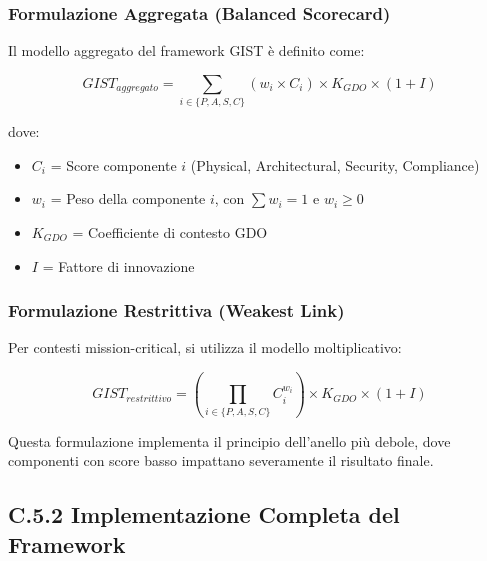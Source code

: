 \subsubsection{Formulazione Aggregata (Balanced Scorecard)}

Il modello aggregato del framework GIST è definito come:

\begin{equation}
GIST_{aggregato} = \sum_{i \in \{P,A,S,C\}} (w_i \times C_i) \times K_{GDO} \times (1+I)
\end{equation}

dove:
\begin{itemize}
    \item $C_i$ = Score componente $i$ (Physical, Architectural, Security, Compliance)
    \item $w_i$ = Peso della componente $i$, con $\sum w_i = 1$ e $w_i \geq 0$
    \item $K_{GDO}$ = Coefficiente di contesto GDO
    \item $I$ = Fattore di innovazione
\end{itemize}

\subsubsection{Formulazione Restrittiva (Weakest Link)}

Per contesti mission-critical, si utilizza il modello moltiplicativo:

\begin{equation}
GIST_{restrittivo} = \left(\prod_{i \in \{P,A,S,C\}} C_i^{w_i}\right) \times K_{GDO} \times (1+I)
\end{equation}

Questa formulazione implementa il principio dell'anello più debole, dove componenti con score basso impattano severamente il risultato finale.

\subsection{C.5.2 Implementazione Completa del Framework}

